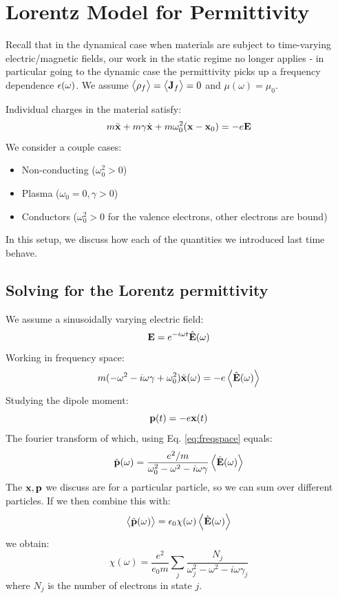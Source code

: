 \section{Lorentz Model for Permittivity}
Recall that in the dynamical case when materials are subject to time-varying electric/magnetic fields, our work in the static regime no longer applies - in particular going to the dynamic case the permittivity picks up a frequency dependence $\epsilon(\omega)$. We assume $\left< \rho_f \right> = \left< \mathbf{J}_f \right> = 0$ and $\mu(\omega) = \mu_0$.

Individual charges in the material satisfy:
\begin{equation}
    m\ddot{\mathbf{x}} + m\gamma\dot{\mathbf{x}} + m\omega_0^2(\mathbf{x} - \mathbf{x}_0) = -e\mathbf{E}
\end{equation}
We consider a couple cases:
\begin{itemize}
    \item Non-conducting ($\omega_0^2 > 0$)
    \item Plasma ($\omega_0 = 0, \gamma > 0$)
    \item Conductors ($\omega_0^2 > 0$ for the valence electrons, other electrons are bound)
\end{itemize}

In this setup, we discuss how each of the quantities we introduced last time behave.

\subsection{Solving for the Lorentz permittivity}
We assume a sinusoidally varying electric field:
\begin{equation}
    \mathbf{E} = e^{-i\omega t}\hat{\mathbf{E}}(\omega)
\end{equation}
Working in frequency space:
\begin{equation}\label{eq:freqspace}
    m(-\omega^2 - i\omega \gamma + \omega_0^2)\hat{\mathbf{x}}(\omega) = -e\left< \hat{\mathbf{E}}(\omega) \right>
\end{equation}
Studying the dipole moment:
\begin{equation}
    \mathbf{p}(t) = -e\mathbf{x}(t)
\end{equation}
The fourier transform of which, using Eq. \eqref{eq:freqspace} equals:
\begin{equation}
    \hat{\mathbf{p}}(\omega) = \frac{e^2/m}{\omega_0^2 - \omega^2 - i\omega\gamma}\left< \hat{\mathbf{E}}(\omega) \right>
\end{equation} 
The $\mathbf{x}, \mathbf{p}$ we discuss are for a particular particle, so we can sum over different particles. If we then combine this with:
\begin{equation}
    \left< \hat{\mathbf{p}}(\omega) \right> = \epsilon_0\chi(\omega)\left< \hat{\mathbf{E}}(\omega) \right>
\end{equation}
we obtain:
\begin{equation}
    \chi(\omega) = \frac{e^2}{e_0m}\sum_j \frac{N_j}{\omega_j^2 - \omega^2 - i\omega\gamma_j}
\end{equation}
where $N_j$ is the number of electrons in state $j$.

